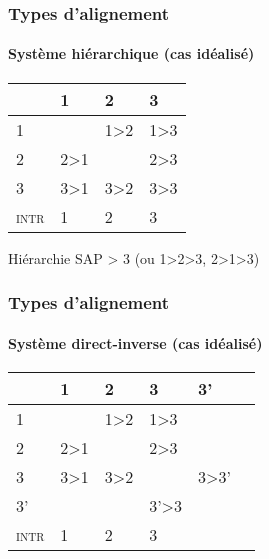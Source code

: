 





\begin{frame} 
 \frametitle{Types d'alignement} 
  \framesubtitle{Système hiérarchique (cas idéalisé)}

 \begin{table}[H]  %
   \centering \label{tab:hierarch}
   \begin{tabular}{l|lll|} 
     \toprule
     &1 & 2 &3\\
     \midrule
     1 &\grise{} &1>2  & 1>3 \cellcolor[wave]{465} \\
     2&2>1 &\grise{}&2>3 \cellcolor[wave]{530} \\
     3&3>1 \cellcolor[wave]{465}&3>2 \cellcolor[wave]{530}&3>3\cellcolor[wave]{630}\\
     \midrule
     \textsc{intr}&\cellcolor[wave]{465}1&\cellcolor[wave]{530}2&\cellcolor[wave]{630}3\\
     \bottomrule
   \end{tabular}
 \end{table}

 Hiérarchie SAP > 3 (ou 1>2>3, 2>1>3)
\end{frame}  
% 

\begin{frame} 
 \frametitle{Types d'alignement} 
 \framesubtitle{Système direct-inverse (cas idéalisé)}
 \begin{table}[H]  %
   \centering \label{tab:inv-proto2}
   \begin{tabular}{l|lllll}
     \toprule
     &1 & 2 &3&3'\\
     \midrule
     1 &\grise{} &1>2 \cellcolor[wave]{400}& 1>3\cellcolor[wave]{400}&\cellcolor[wave]{400} \\
     2&2>1\cellcolor[wave]{500}&\grise{}&2>3 \cellcolor[wave]{400}&\cellcolor[wave]{400}\\
     3&3>1\cellcolor[wave]{500}&3>2\cellcolor[wave]{500}&\grise{}&3>3'\cellcolor[wave]{400}\\
     3'&\cellcolor[wave]{500}&\cellcolor[wave]{500}&3'>3\cellcolor[wave]{500}&\grise{}\\
     \midrule
     \textsc{intr}&1&2&3\\
     \bottomrule
   \end{tabular}
 \end{table}
\end{frame}


